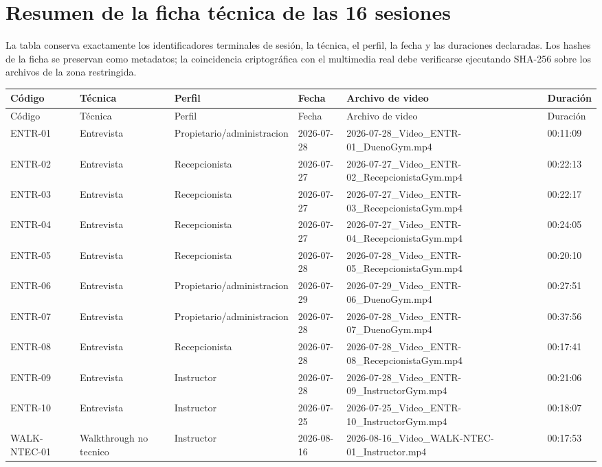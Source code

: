 \documentclass[11pt,a4paper,twoside]{article}
\begin{document}
\section{Resumen de la ficha técnica de las 16 sesiones}
La tabla conserva exactamente los identificadores terminales de sesión, la técnica, el perfil, la fecha y las duraciones declaradas. Los hashes de la ficha se preservan como metadatos; la coincidencia criptográfica con el multimedia real debe verificarse ejecutando SHA-256 sobre los archivos de la zona restringida.
\begin{landscape}
\scriptsize
\begin{longtable}{p{2.2cm}p{3.2cm}p{4.2cm}p{2.7cm}p{7.8cm}p{2.2cm}}
\toprule Código & Técnica & Perfil & Fecha & Archivo de video & Duración \\ \midrule\endfirsthead
\toprule Código & Técnica & Perfil & Fecha & Archivo de video & Duración \\ \midrule\endhead
ENTR-01 & Entrevista & Propietario/administracion & 2026-07-28 & 2026-07-28\_Video\_ENTR-01\_DuenoGym.mp4 & 00:11:09 \\
ENTR-02 & Entrevista & Recepcionista & 2026-07-27 & 2026-07-27\_Video\_ENTR-02\_RecepcionistaGym.mp4 & 00:22:13 \\
ENTR-03 & Entrevista & Recepcionista & 2026-07-27 & 2026-07-27\_Video\_ENTR-03\_RecepcionistaGym.mp4 & 00:22:17 \\
ENTR-04 & Entrevista & Recepcionista & 2026-07-27 & 2026-07-27\_Video\_ENTR-04\_RecepcionistaGym.mp4 & 00:24:05 \\
ENTR-05 & Entrevista & Recepcionista & 2026-07-28 & 2026-07-28\_Video\_ENTR-05\_RecepcionistaGym.mp4 & 00:20:10 \\
ENTR-06 & Entrevista & Propietario/administracion & 2026-07-29 & 2026-07-29\_Video\_ENTR-06\_DuenoGym.mp4 & 00:27:51 \\
ENTR-07 & Entrevista & Propietario/administracion & 2026-07-28 & 2026-07-28\_Video\_ENTR-07\_DuenoGym.mp4 & 00:37:56 \\
ENTR-08 & Entrevista & Recepcionista & 2026-07-28 & 2026-07-28\_Video\_ENTR-08\_RecepcionistaGym.mp4 & 00:17:41 \\
ENTR-09 & Entrevista & Instructor & 2026-07-28 & 2026-07-28\_Video\_ENTR-09\_InstructorGym.mp4 & 00:21:06 \\
ENTR-10 & Entrevista & Instructor & 2026-07-25 & 2026-07-25\_Video\_ENTR-10\_InstructorGym.mp4 & 00:18:07 \\
WALK-NTEC-01 & Walkthrough no tecnico & Instructor & 2026-08-16 & 2026-08-16\_Video\_WALK-NTEC-01\_Instructor.mp4 & 00:17:53 \\

\end{longtable}
\end{landscape}
\end{document}
